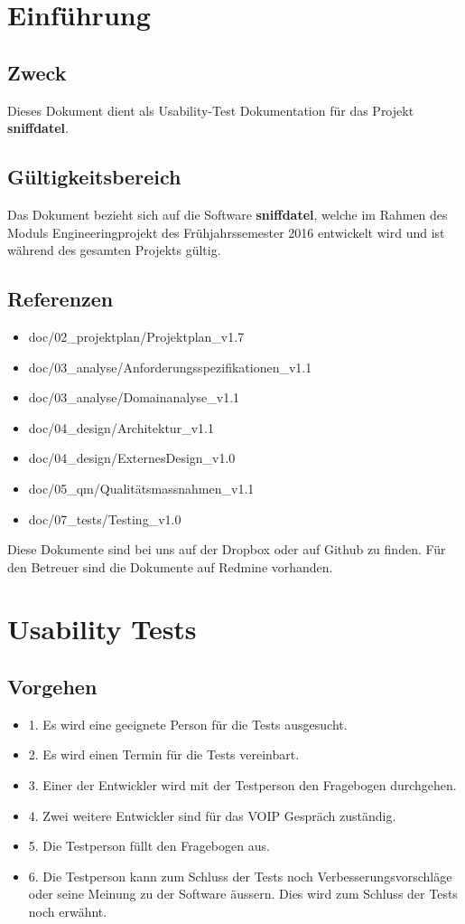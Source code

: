 \documentclass[a4,12pt]{scrartcl}
\begin{document}
\section{Einführung}
\subsection{Zweck}
Dieses Dokument dient als Usability-Test Dokumentation für das Projekt \textbf{sniffdatel}. 
\subsection{Gültigkeitsbereich}
Das Dokument bezieht sich auf die Software \textbf{sniffdatel}, welche im Rahmen des Moduls Engineeringprojekt des Frühjahrssemester 2016 entwickelt wird und ist während des gesamten Projekts gültig. 
\subsection{Referenzen}
\begin{itemize}
\item doc/02\_projektplan/Projektplan\_v1.7
\item doc/03\_analyse/Anforderungsspezifikationen\_v1.1
\item doc/03\_analyse/Domainanalyse\_v1.1
\item doc/04\_design/Architektur\_v1.1
\item doc/04\_design/ExternesDesign\_v1.0
\item doc/05\_qm/Qualitätsmassnahmen\_v1.1
\item doc/07\_tests/Testing\_v1.0
\end{itemize}

\noindent Diese Dokumente sind bei uns auf der Dropbox oder auf Github zu finden. Für den Betreuer sind die Dokumente auf Redmine vorhanden. 
\newpage

\section{Usability Tests}

\subsection{Vorgehen}
\begin{itemize}
\item 1. Es wird eine geeignete Person für die Tests ausgesucht. 
\item 2. Es wird einen Termin für die Tests vereinbart.
\item 3. Einer der Entwickler wird mit der Testperson den Fragebogen durchgehen. 
\item 4. Zwei weitere Entwickler sind für das VOIP Gespräch zuständig. 
\item 5. Die Testperson füllt den Fragebogen aus. 
\item 6. Die Testperson kann zum Schluss der Tests noch Verbesserungsvorschläge oder seine Meinung zu der Software äussern. Dies wird zum Schluss der Tests noch erwähnt.  
\end{itemize}
\end{document}
